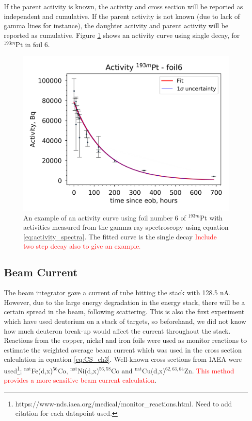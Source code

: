 \documentclass[a4paper,11pt,twoside]{book}
\begin{document}
\noindent 
If the parent activity is known, the activity and cross section will be reported as independent and cumulative. If the parent activity is not known (due to lack of gamma lines for instance), the daughter activity and parent activity will be reported as cumulative. Figure \ref{fig:193mPt_activitycurve} shows an activity curve using single decay, for $^{193m}$Pt in foil 6. 

\begin{figure}
    \centering
    \includegraphics{Analysis/_activity_193mPt_677.png}
    \caption{An example of an activity curve using foil number 6 of $^{193m}$Pt with activities measured from the gamma ray spectroscopy using equation \ref{eq:activity_spectra}. The fitted curve is the single decay \textcolor{red}{Include two step decay also to give an example. } }  
    \label{fig:193mPt_activitycurve}
\end{figure}


\subsection{Beam Current}

The beam integrator gave a current of tube hitting the stack with 128.5 nA. However, due to the large energy degradation in the energy stack, there will be a certain spread in the beam, following scattering. This is also the first experiment which have used deuterium on a stack of targets, so beforehand, we did not know how much deuteron break-up would affect the current throughout the stack. Reactions from the copper, nickel and iron foils were used as monitor reactions to estimate the weighted average beam current which was used in the cross section calculation in equation \ref{eq:CS_ch3}. Well-known cross sections from IAEA were used\footnote{https://www-nds.iaea.org/medical/monitor_reactions.html. Need to add citation for each datapoint used.}; $^{\text{nat}}$Fe(d,x)$^{56}$Co, $^{\text{nat}}$Ni(d,x)$^{56,58}$Co and $^{\text{nat}}$Cu(d,x)$^{62,63,64}$Zn. \textcolor{red}{This method provides a more sensitive beam current calculation}. \\ 
\end{document}
